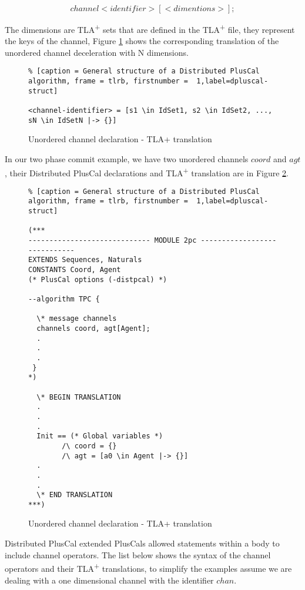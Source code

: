 \documentclass{thesul}
\newcommand{\tlaplus}{TLA\textsuperscript{+}\xspace}
\begin{document}
\[
 channel <identifier>[<dimentions>];
\]


The dimensions are \tlaplus sets that are defined in the \tlaplus file, they represent the keys of the channel, Figure \ref{unorderedtla} shows the corresponding translation of the unordered channel deceleration with N dimensions.


\FloatBarrier
\begin{figure}[!h]
\begin{lstlisting}% [caption = General structure of a Distributed PlusCal algorithm, frame = tlrb, firstnumber =  1,label=dpluscal-struct]

<channel-identifier> = [s1 \in IdSet1, s2 \in IdSet2, ..., sN \in IdSetN |-> {}]

\end{lstlisting}
\caption{Unordered channel declaration - TLA+ translation}
\label{unorderedtla}
\end{figure}
\FloatBarrier


In our two phase commit example, we have two unordered channels $coord$ and $agt$, their Distributed PlusCal declarations and \tlaplus translation are in Figure \ref{2pcchannels}.

\FloatBarrier
\begin{figure}[!h]
\begin{lstlisting}% [caption = General structure of a Distributed PlusCal algorithm, frame = tlrb, firstnumber =  1,label=dpluscal-struct]

(***
----------------------------- MODULE 2pc -----------------------------
EXTENDS Sequences, Naturals
CONSTANTS Coord, Agent
(* PlusCal options (-distpcal) *)
  
--algorithm TPC { 

  \* message channels
  channels coord, agt[Agent];
  .
  .
  .
 }
*)
  
  \* BEGIN TRANSLATION 
  .
  .
  .
  Init == (* Global variables *)
        /\ coord = {}
        /\ agt = [a0 \in Agent |-> {}]
  .
  .
  .      
  \* END TRANSLATION 
***)

\end{lstlisting}
\caption{Unordered channel declaration - TLA+ translation}
\label{2pcchannels}
\end{figure}
\FloatBarrier

Distributed PlusCal extended PlusCals allowed statements within a body to include channel operators.
The list below shows the syntax of the channel operators and their \tlaplus translations, to simplify the examples assume we are dealing with a one dimensional channel with the identifier $chan$.
\end{document}
